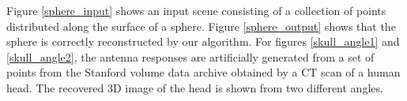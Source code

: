 \documentclass[twocolumn]{article}
\begin{document}
Figure \ref{sphere_input} shows an input scene consisting of a collection of points distributed along the surface of a sphere. Figure \ref{sphere_output} shows that the sphere is correctly reconstructed by our algorithm. For figures \ref{skull_angle1} and \ref{skull_angle2}, the antenna responses are artificially generated from a set of points from the Stanford volume data archive obtained by a CT scan of a human head. The recovered 3D image of the head is shown from two different angles.

\begin{figure}
\begin{centering}

\end{centering}
\end{figure}
\end{document}
